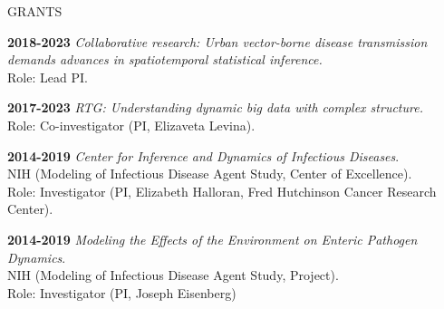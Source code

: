 
\lsp

\begin{mylist} {GRANTS}

\item{\bf 2018-2023} {\em Collaborative research: Urban vector-borne disease transmission demands advances in spatiotemporal statistical inference.}
\\
Role: Lead PI.


\item{\bf 2017-2023 } {\em RTG: Understanding dynamic big data with complex structure.} 
\\
Role: Co-investigator (PI, Elizaveta Levina). 

  
\item{\bf 2014-2019 } {\em Center for Inference and Dynamics of Infectious Diseases}.
\\
NIH (Modeling of Infectious Disease Agent Study, Center of Excellence). \\
Role: Investigator (PI, Elizabeth Halloran, Fred Hutchinson Cancer Research Center).

\item{\bf 2014-2019 } {\em Modeling the Effects of the Environment on Enteric Pathogen Dynamics}.
\\
NIH (Modeling of Infectious Disease Agent Study, Project). \\
Role: Investigator (PI, Joseph Eisenberg)  


\end{mylist}
